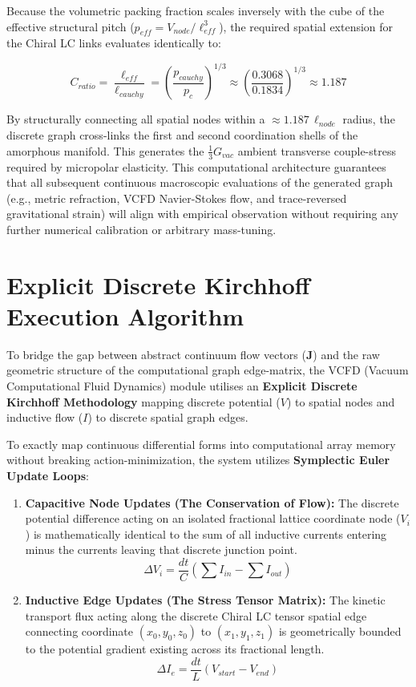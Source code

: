 Because the volumetric packing fraction scales inversely with the cube of the effective structural pitch ($p_{eff} = V_{node} / \ell_{eff}^3$), the required spatial extension for the Chiral LC links evaluates identically to:

\begin{equation}
    C_{ratio} = \frac{\ell_{eff}}{\ell_{cauchy}} = \left( \frac{p_{cauchy}}{p_{c}} \right)^{1/3} \approx \left( \frac{0.3068}{0.1834} \right)^{1/3} \approx \mathbf{1.187}
\end{equation}

By structurally connecting all spatial nodes within a $\approx 1.187 \, \ell_{node}$ radius, the discrete graph cross-links the first and second coordination shells of the amorphous manifold. This generates the $\frac{1}{3} G_{vac}$ ambient transverse couple-stress required by micropolar elasticity. This computational architecture guarantees that all subsequent continuous macroscopic evaluations of the generated graph (e.g., metric refraction, VCFD Navier-Stokes flow, and trace-reversed gravitational strain) will align with empirical observation without requiring any further numerical calibration or arbitrary mass-tuning.

\section{Explicit Discrete Kirchhoff Execution Algorithm}
To bridge the gap between abstract continuum flow vectors ($\mathbf{J}$) and the raw geometric structure of the computational graph edge-matrix, the VCFD (Vacuum Computational Fluid Dynamics) module utilises an \textbf{Explicit Discrete Kirchhoff Methodology} mapping discrete potential ($V$) to spatial nodes and inductive flow ($I$) to discrete spatial graph edges.

To exactly map continuous differential forms into computational array memory without breaking action-minimization, the system utilizes \textbf{Symplectic Euler Update Loops}:
\begin{enumerate}
    \item \textbf{Capacitive Node Updates (The Conservation of Flow):} The discrete potential difference acting on an isolated fractional lattice coordinate node ($V_i$) is mathematically identical to the sum of all inductive currents entering minus the currents leaving that discrete junction point. 
    \[ \Delta V_i = \frac{dt}{C} \left( \sum I_{in} - \sum I_{out} \right) \]
    \item \textbf{Inductive Edge Updates (The Stress Tensor Matrix):} The kinetic transport flux acting along the discrete Chiral LC tensor spatial edge connecting coordinate $(x_0, y_0, z_0)$ to $(x_1, y_1, z_1)$ is geometrically bounded to the potential gradient existing across its fractional length. 
    \[ \Delta I_e = \frac{dt}{L} \left( V_{start} - V_{end} \right) \] 
\end{enumerate}

